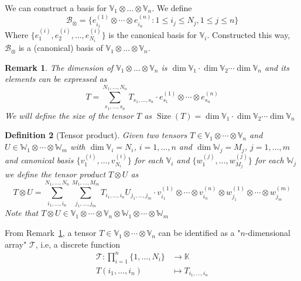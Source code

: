 \documentclass[11pt,a4paper,openright,oneside]{book}
\numberwithin{equation}{section}
\newtheorem{defn0}{Definition}[chapter]
\newtheorem{remark0}[defn0]{Remark}
\newenvironment{definition}{ \begin{defn0}}{\end{defn0}}
\newenvironment{remark}{ \begin{remark0}\rm}{\end{remark0}}
\newcommand{\remref}[1]{Remark~\ref{#1}}
\DeclareMathOperator{\size}{Size}
\begin{document}
We can construct a basis for $\mathbb{V}_1 \otimes \dots \otimes \mathbb{V}_n$. We define
$$\mathcal{B}_{\otimes} = \{e_{i_1}^{(1)} \otimes \cdots \otimes e_{i_n}^{(n)} : 1 \leqslant i_j \leqslant N_j, 1 \leqslant j \leqslant n\}$$
Where $\{e_1^{(i)}, e_2^{(i)}, \dots, e_{N_i}^{(i)}\}$ is the canonical basis for $\mathbb{V}_i$.
Constructed this way, $\mathcal{B}_\otimes$ is a (canonical) basis of ${\mathbb{V}_1 \otimes \dots \otimes \mathbb{V}_n}$.

\begin{remark} \label{rem:tenbase} The dimension
    of ${\mathbb{V}_1 \otimes \dots \otimes \mathbb{V}_n}$ is ${\dim{\mathbb{V}_1} \cdot \dim{\mathbb{V}_2} \cdots \dim{\mathbb{V}_n}}$ and its elements can be expressed as
    \begin{equation} \label{eq:base-representation}
T = \sum_{s_1, \dots, s_n}^{N_1, \dots, N_n} T_{s_1, \dots, s_n} \cdot  e_{s_1}^{(1)} \otimes \cdots \otimes e_{s_n}^{(n)}
\end{equation}
We will define the size of the tensor $T$ as $\size(T) = \dim \mathbb{V}_1 \cdot \dim \mathbb{V}_2 \cdots \dim \mathbb{V}_n$
\end{remark}


\begin{definition}[Tensor product] Given two tensors $T \in \mathbb{V}_1 \otimes \cdots \otimes \mathbb{V}_n$ and ${U \in \mathbb{W}_1 \otimes \cdots \otimes
    \mathbb{W}_m}$ with $\dim \mathbb{V}_i = N_i$, $i = 1, \dots, n$ and $\dim \mathbb{W}_j = M_j$, $j = 1, \dots, m$ 
    and canonical basis $\{v_1^{(i)}, \dots, v_{N_i}^{(i)}\}$ for each $\mathbb{V}_i$ and $\{w_1^{(j)}, \dots, w_{M_j}^{(j)}\}$ for each $\mathbb{W}_j$
    we define the tensor product
    $T \otimes U$ as
    $$ T \otimes U = \sum_{i_1, \dots, i_n}^{N_1, \dots, N_n} \sum_{j_1, \dots, j_m}^{M_1, \dots, M_m} T_{i_1, \dots, i_n} U_{j_1, \dots, j_m} \cdot
    v_{i_1}^{(1)} \otimes \cdots \otimes v_{i_n}^{(n)} \otimes w_{j_1}^{(1)} \otimes \cdots \otimes w_{j_m}^{(m)}$$
    Note that $T \otimes U \in \mathbb{V}_1 \otimes \cdots \otimes \mathbb{V}_n \otimes \mathbb{W}_1 \otimes \cdots \otimes \mathbb{W}_m$

\end{definition}

From \remref{rem:tenbase}, a tensor $T \in \mathbb{V}_1 \otimes \cdots \otimes \mathbb{V}_n$ can be identified as a "$n$-dimensional array" $\mathcal{T}$, i.e,
a discrete function
$$\begin{align}
    \mathcal{T}: \prod_{i=1}^n \{1, \dots, N_i\} & \longrightarrow \mathbb{K} \\
    T(i_1, \dots, i_n) & \longmapsto T_{i_1, \dots, i_n}
\end{align}$$
\end{document}
